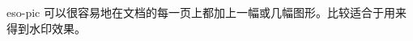  
 
 
 
 
\usepackage{picins} 
 
\usepackage{picinpar} 
 
 
eso-pic 
可以很容易地在文档的每一页上都加上一幅或几幅图形。比较适合于用来得到水印效果。
 
 
 
